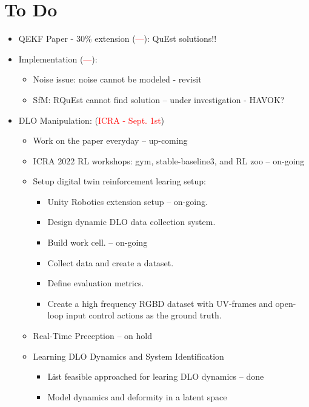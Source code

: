 \documentclass[11pt]{article}
\begin{document}
\section{To Do}
\begin{itemize}
  \item QEKF Paper - 30\% extension (\textcolor{red}{---}): QuEst solutions!!
  \item Implementation (\textcolor{red}{---}):
  \begin{itemize}
      \item Noise issue: noise cannot be modeled - revisit
      \item SfM: RQuEst cannot find solution -- under investigation - HAVOK?
  \end{itemize}
  \item  DLO Manipulation: (\textcolor{red}{ICRA - Sept. 1st})
  \begin{itemize}
      \item Work on the paper everyday -- up-coming
      \item ICRA 2022 RL workshops: gym, stable-baseline3, and RL zoo -- on-going
      \item Setup digital twin reinforcement learing setup:
      \begin{itemize}
        \item Unity Robotics extension setup -- on-going.
        \item Design dynamic DLO data collection system.
        \item Build work cell. -- on-going
        \item Collect data and create a dataset.
        \item Define evaluation metrics.
        \item Create a high frequency RGBD dataset with UV-frames and open-loop input control actions as the ground truth.
      \end{itemize}
      \item Real-Time Preception -- on hold
      \item Learning DLO Dynamics and System Identification
      \begin{itemize}
            \item List feasible approached for learing DLO dynamics -- done
            \item Model dynamics and deformity in a latent space
      \end{itemize}
  \end{itemize}
\end{itemize}
\end{document}
